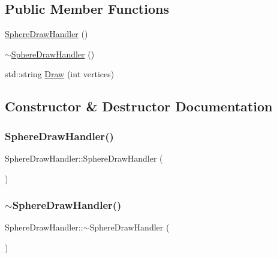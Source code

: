 \subsection*{Public Member Functions}
\begin{DoxyCompactItemize}
\item 
\mbox{\hyperlink{class_sphere_draw_handler_a3e3d135801c39355bfe68163f388e615}{Sphere\+Draw\+Handler}} ()
\item 
\mbox{\hyperlink{class_sphere_draw_handler_a01d37cbabaf87f2048d972ac37a8371a}{$\sim$\+Sphere\+Draw\+Handler}} ()
\item 
std\+::string \mbox{\hyperlink{class_sphere_draw_handler_a2e94208cf2d1a86d5c5158d9bb9adf9e}{Draw}} (int vertices)
\end{DoxyCompactItemize}


\subsection{Constructor \& Destructor Documentation}
\mbox{\label{class_sphere_draw_handler_a3e3d135801c39355bfe68163f388e615}} 
\subsubsection{\texorpdfstring{SphereDrawHandler()}{SphereDrawHandler()}}
{\footnotesize\ttfamily Sphere\+Draw\+Handler\+::\+Sphere\+Draw\+Handler (\begin{DoxyParamCaption}{ }\end{DoxyParamCaption})}

\mbox{\label{class_sphere_draw_handler_a01d37cbabaf87f2048d972ac37a8371a}} 
\subsubsection{\texorpdfstring{$\sim$SphereDrawHandler()}{~SphereDrawHandler()}}
{\footnotesize\ttfamily Sphere\+Draw\+Handler\+::$\sim$\+Sphere\+Draw\+Handler (\begin{DoxyParamCaption}{ }\end{DoxyParamCaption})}



